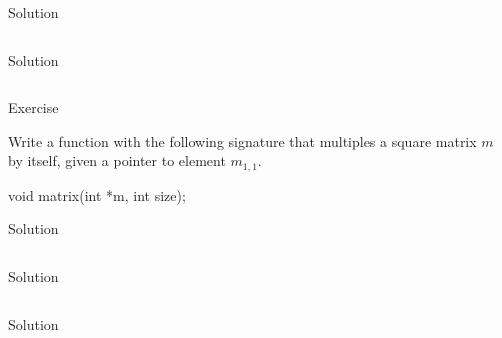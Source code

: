 \documentclass[compress]{beamer}
\begin{document}
\begin{slide}
	\begin{block}{Solution}

	\inputminted[fontsize=\scriptsize, firstline=10, lastline=25, linenos]{c}{
		\resDirectory/reverse.c
	}

	\end{block}
\end{slide}

\begin{slide}
	\begin{block}{Solution}

	\inputminted[fontsize=\scriptsize, firstline=27, linenos]{c}{
		\resDirectory/reverse.c
	}

	\end{block}
\end{slide}

\begin{slide}
	\begin{block}{Exercise}

	Write a function with the following signature that multiples a square matrix $m$ by itself, given a pointer to element $m_{1,1}$.

	\begin{terminal}
	void matrix(int *m, int size);
	\end{terminal}

	\end{block}
\end{slide}

\begin{slide}
	\begin{block}{Solution}

	\inputminted[fontsize=\scriptsize, firstline=17, lastline=28, linenos]{c}{
		\resDirectory/matrix.c
	}

	\end{block}
\end{slide}

\begin{slide}
	\begin{block}{Solution}

	\inputminted[fontsize=\scriptsize, firstline=30, lastline=38, linenos]{c}{
		\resDirectory/matrix.c
	}

	\end{block}
\end{slide}

\begin{slide}
	\begin{block}{Solution}

	\inputminted[fontsize=\scriptsize, firstline=40, lastline=48, linenos]{c}{
		\resDirectory/matrix.c
	}

	\end{block}
\end{slide}
\end{document}
